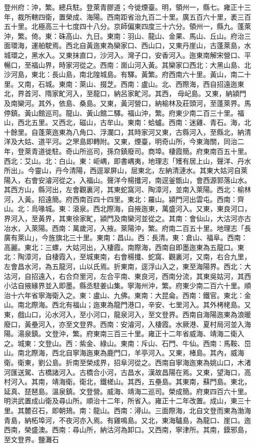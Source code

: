 \begin{pinyinscope}
登州府：沖，繁。總兵駐。登萊青膠道；今徙煙臺。明，領州一，縣七。雍正十三年，裁所轄四衛，置榮成、海陽。西南距省治九百二十里。廣五百六十里，袤三百五十里。北極高三十七度四十八分。京師偏東四度三十六分。領州一，縣九。蓬萊沖，繁。倚。東：硃高山、九日。東南：羽山、龍山、金果、馬山、丘山。府治三面環海，運舶駛焉。西北自黃迤東為欒家口、西山口，又東丹崖山，古蓬萊島，水城環之，黑水入。又東抹直口，沙河入。灣子口，安香河入。迤東南解宋營口、平暢口，至福山界，時家河從之。西南：崮山河入黃。其欒家口西北：大黑山島、北沙河島，東北：長山島，南北隍城島。有驛。黃繁。府西南六十里。黃山，南二十里。又南，石城。東南：萊山、掇芝。西南：盧山。北、西際海，西自招遠迤東北，界首河、隋家甿河入，至龍口，納呂家甿河。其西，母屺島。又東，納潁門及南欒河。其外，依島、桑島。又東，黃河營口，納榆林及莊頭河，至蓬萊界。馬停鎮。黃山館巡司。龍山、黃山館二驛。福山沖，繁。府東少南二百三十里。福山，西北五里。又西北，磁山，古牟山。東南：蛤蠦。西南：迷雞、青石。海，北十餘里。自蓬萊迤東為八角口、浮瀾口，其時家河又東，古縣河入，至縣北，納清洋及大姑、道平河。之罘島即轉附。又東，煙臺，明奇山所，今東海關，同治二年，登萊青道徙駐。奇山所巡司，孫夼鎮廢司。商埠。棲霞簡。府東南百五十里。西北：艾山。北：白山。東：岠嵎，即書嵎夷，地理志「矱有居上山，聲洋、丹水所出」。今靈山，丹今清陽，西逕翠屏山，屈東北，左納清漣水。其東大姑河自萊陽入，右會安濬河從之，入福山。聲洋今楊攕河，南逕釜甑山，會西源郭落山水。其西方山，縣河出，左會觀裏河，其東蛇窩河、陶漳河，並南入萊陽。西北：榆林河，入黃。招遠簡。府西南百四十四里。東北：羅山。潁門河出雲屯。西南：齊山。北：烏喙城。東：滾泉。西北際海，自掖迤東，萬盛河入。又東，東良河口，界河入，至黃界，其東徐家甿，潁門及南欒河並從之。其南：會仙山，大沽河亦古冶水，入萊陽。西南：萬歲河，入掖。萊陽沖，繁。府南二百五十里。地理志「長廣有萊山」，今旌旗北三十里。東南：昌山。西：長清。東：倉山、福阜。西南：高麗。東北：三螺，大姑河出，入棲霞。南際海，西南自即墨迤東為五龍口。東北：陶漳河，自棲霞入，至城東南，右會楊攕、蛇窩、觀裏河，又南，右合九里，左會昌水河，為五龍河，山以氏焉。折東南，逕浮山入之，東至海陽界。西北：大沽河，自招遠入，右合夼里河，左合平南、東良河，西南分流，其東吳姑河，其西小沽自掖緣界並入即墨。縣丞駐姜山集。寧海州沖，繁。府東少南二百六十里。順治十六年省寧海衛入之。東：盧山、九佛。東南：大昆侖。西南：鐵官。東北：金山。南北際海。西北有福山；迤東為龍門港口，辛安、七里河入。其外栲栳島。又東，戲山口，沁水河入，至小河口，龍泉河入，至文登界。西南自海陽迤東為浪暖廢口，黃壘河入，亦至文登界。西南：安濬河，入棲霞。水厥港、夏村局河並入海陽。湯泉鎮。文登沖，繁。府東南三百三十里。雍正十二年省威海、靖海二衛入之。城東：文登山。西：紫金、綠山。東南：斥山、石門、牛仙。西南：馬鞍、岊山。南北際海，西北自寧海迤東為鹿門口，羊亭河入。又東，楮島。其內，威海衛。衛東，劉公島。折南至榮成界，招阜河從之。西南自寧海迤東為姚山口，木渚河匯送駕、古橋諸河入。古橋合小河，古昌水，漢故昌陽在焉。又東，望海口，高村河入。其南，靖海衛。衛北，鐵槎山。其西，五壘島。其東南，蘇門島。東北，延真、琵琶島。溫泉鎮。文登營。威海、靖海二巡司。榮成簡。府東四百六十里。明洪武置成山衛及尋山所。順治十二年，所省入。雍正十二年改置。成山，東三十里。其麓召石，即朝鳷。南：龍山。西南：潯山。三面際海，北自文登而東為渤海青島，納柘埠河，不夜河亦入焉。有雞鳴島。又北，東海驢島，為龍口、崖口。迤西南，榮盛澳。西南：尋山所，納沽河為卸口。又西南，寧津所。其南，鏌邪島，至文登界。鹽灘石
\end{pinyinscope}
